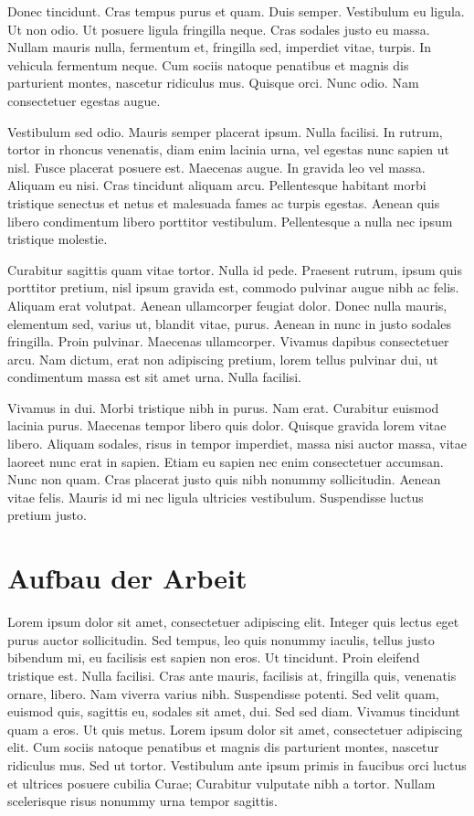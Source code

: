 Donec tincidunt. Cras tempus purus et quam. Duis semper. Vestibulum eu ligula. Ut non odio. Ut posuere ligula fringilla neque. Cras sodales justo eu massa. Nullam mauris nulla, fermentum et, fringilla sed, imperdiet vitae, turpis. In vehicula fermentum neque. Cum sociis natoque penatibus et magnis dis parturient montes, nascetur ridiculus mus. Quisque orci. Nunc odio. Nam consectetuer egestas augue.

Vestibulum sed odio. Mauris semper placerat ipsum. Nulla facilisi. In rutrum, tortor in rhoncus venenatis, diam enim lacinia urna, vel egestas nunc sapien ut nisl. Fusce placerat posuere est. Maecenas augue. In gravida leo vel massa. Aliquam eu nisi. Cras tincidunt aliquam arcu. Pellentesque habitant morbi tristique senectus et netus et malesuada fames ac turpis egestas. Aenean quis libero condimentum libero porttitor vestibulum. Pellentesque a nulla nec ipsum tristique molestie.

Curabitur sagittis quam vitae tortor. Nulla id pede. Praesent rutrum, ipsum quis porttitor pretium, nisl ipsum gravida est, commodo pulvinar augue nibh ac felis. Aliquam erat volutpat. Aenean ullamcorper feugiat dolor. Donec nulla mauris, elementum sed, varius ut, blandit vitae, purus. Aenean in nunc in justo sodales fringilla. Proin pulvinar. Maecenas ullamcorper. Vivamus dapibus consectetuer arcu. Nam dictum, erat non adipiscing pretium, lorem tellus pulvinar dui, ut condimentum massa est sit amet urna. Nulla facilisi.

Vivamus in dui. Morbi tristique nibh in purus. Nam erat. Curabitur euismod lacinia purus. Maecenas tempor libero quis dolor. Quisque gravida lorem vitae libero. Aliquam sodales, risus in tempor imperdiet, massa nisi auctor massa, vitae laoreet nunc erat in sapien. Etiam eu sapien nec enim consectetuer accumsan. Nunc non quam. Cras placerat justo quis nibh nonummy sollicitudin. Aenean vitae felis. Mauris id mi nec ligula ultricies vestibulum. Suspendisse luctus pretium justo. 

\section{Aufbau der Arbeit} 
Lorem ipsum dolor sit amet, consectetuer adipiscing elit. Integer quis lectus eget purus auctor sollicitudin. Sed tempus, leo quis nonummy iaculis, tellus justo bibendum mi, eu facilisis est sapien non eros. Ut tincidunt. Proin eleifend tristique est. Nulla facilisi. Cras ante mauris, facilisis at, fringilla quis, venenatis ornare, libero. Nam viverra varius nibh. Suspendisse potenti. Sed velit quam, euismod quis, sagittis eu, sodales sit amet, dui. Sed sed diam. Vivamus tincidunt quam a eros. Ut quis metus. Lorem ipsum dolor sit amet, consectetuer adipiscing elit. Cum sociis natoque penatibus et magnis dis parturient montes, nascetur ridiculus mus. Sed ut tortor. Vestibulum ante ipsum primis in faucibus orci luctus et ultrices posuere cubilia Curae; Curabitur vulputate nibh a tortor. Nullam scelerisque risus nonummy urna tempor sagittis.

